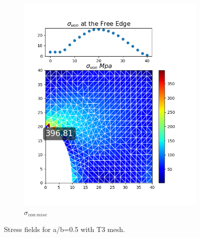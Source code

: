 \documentclass[twoside,twocolumn,10pt]{article}
\begin{document}
\begin{figure}[!ht]
\begin{subfigure}[c]{0.26\textwidth}
    \includegraphics[width=1.\linewidth]{Q2_5/Q5_0.5_von_triangle.png}
    \caption{$\sigma_{von \, mise}$}
    \label{fig:von_triangle_0.5}
  \end{subfigure}
  \caption{Stress fields for a/b=0.5 with T3 mesh.}
  \label{fig:triangle_0.5}
\end{figure}
\end{document}
